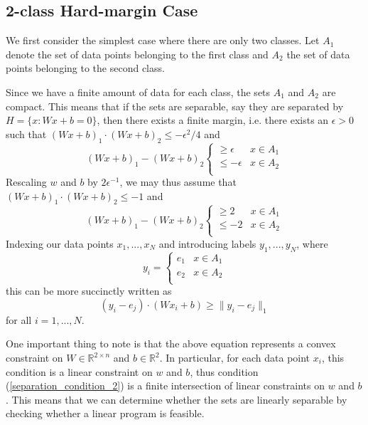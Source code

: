 \subsection{2-class Hard-margin Case}
We first consider the simplest case where there are only two classes. Let $A_1$ denote the set of data points belonging to the
first class and $A_2$ the set of data points belonging to the second class. 

Since we have a finite amount of data for each class, the sets $A_1$ and $A_2$ are compact. This means that if the sets are
separable, say they are separated by $H=\{x:Wx+b=0\}$, then there exists a finite margin, i.e. there exists an $\epsilon > 0$
such that $(Wx+b)_1\cdot(Wx+b)_2\leq -\epsilon^2/4$ and
\begin{equation}
    (Wx+b)_1 - (Wx+b)_2  \begin{cases} 
      \geq \epsilon & x\in A_1 \\
      \leq -\epsilon & x\in A_2 \\
   \end{cases}
\end{equation}
Rescaling $w$ and $b$ by $2\epsilon^{-1}$, we may thus assume that $(Wx+b)_1\cdot(Wx+b)_2\leq -1$ and 
\begin{equation}
  (Wx+b)_1 - (Wx+b)_2 \begin{cases} 
      \geq 2 & x\in A_1 \\
      \leq -2 & x\in A_2 \\
   \end{cases}
\end{equation}
Indexing our data points $x_1,...,x_N$ and introducing labels $y_1,...,y_N$, where
\begin{equation}
 y_i = \begin{cases} 
      e_1 & x\in A_1 \\
      e_2 & x\in A_2 \\
   \end{cases}
\end{equation}
this can be more succinctly written as
\begin{equation}\label{separation_condition_2}
 (y_i - e_j)\cdot (Wx_i+b) \geq \|y_i - e_j\|_1
\end{equation}
for all $i = 1,...,N$.

One important thing to note is that the above equation represents a convex constraint on $W\in \mathbb{R}^{2\times n}$ and
$b\in \mathbb{R}^2$. In particular, for each data point $x_i$, this condition is a linear constraint on $w$ and $b$, thus
condition (\ref{separation_condition_2}) is a finite intersection of linear constraints on $w$ and $b$. This means that
we can determine whether the sets are linearly separable by checking whether a linear program is feasible.

